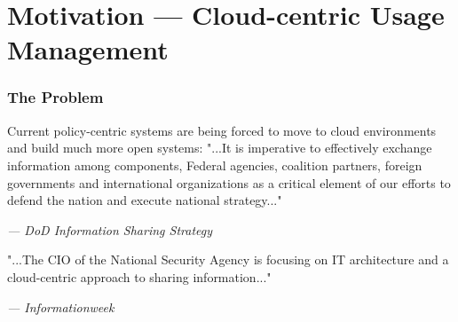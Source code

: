 \section{Motivation --- Cloud-centric Usage Management}


\begin{frame}
\frametitle{The Problem}
Current policy-centric systems are being forced to move to cloud environments and build much more open systems:
\newline
\newline
\newline
"...It is imperative to  effectively exchange information among components, Federal agencies, coalition partners, foreign governments and international organizations as a critical element of our efforts to defend the nation and execute national strategy..."\cite{proposal:info-sharing-strategy}
\newline
\begin{footnotesize}\textit{--- DoD Information Sharing Strategy}\end{footnotesize}
\newline
\newline
\newline
"...The CIO of the National Security Agency is focusing on IT architecture and a cloud-centric approach to sharing information..."\cite{proposal:nsa-cloud}
\newline
\begin{footnotesize}\textit{--- Informationweek}\end{footnotesize}
\end{frame}